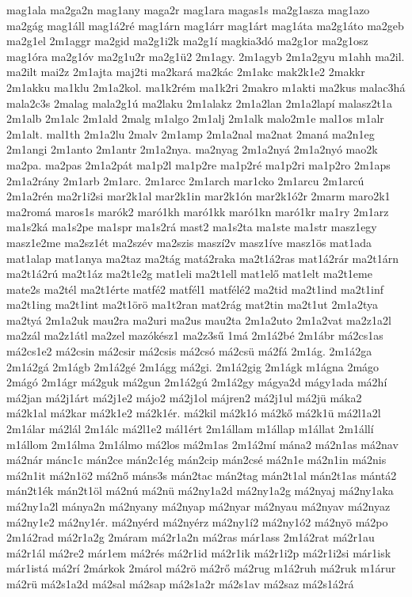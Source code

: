 {mag1ala
ma2ga2n
mag1any
maga2r
mag1ara
magas1s
ma2g1asza
mag1azo
ma2gág
mag1áll
mag1á2ré
mag1árn
mag1árr
mag1árt
mag1áta
ma2g1áto
ma2geb
ma2g1el
2m1aggr
ma2gid
ma2g1i2k
ma2g1í
magkia3dó
ma2g1or
ma2g1osz
mag1óra
ma2g1óv
ma2g1u2r
ma2g1ü2
2m1agy.
2m1agyb
2m1a2gyu
m1ahh
ma2il.
ma2ilt
mai2z
2m1ajta
maj2ti
ma2kará
ma2kác
2m1akc
mak2k1e2
2makkr
2m1akku
ma1klu
2m1a2kol.
ma1k2rém
ma1k2ri
2makro
m1akti
ma2kus
malac3há
mala2c3s
2malag
mala2g1ú
ma2laku
2m1alakz
2m1a2lan
2m1a2lapí
malasz2t1a
2m1alb
2m1alc
2m1ald
2malg
m1algo
2m1alj
2m1alk
malo2m1e
mal1os
m1alr
2m1alt.
mal1th
2m1a2lu
2malv
2m1amp
2m1a2nal
ma2nat
2maná
ma2n1eg
2m1angi
2m1anto
2m1antr
2m1a2nya.
ma2nyag
2m1a2nyá
2m1a2nyó
mao2k
ma2pa.
ma2pas
2m1a2pát
ma1p2l
ma1p2re
ma1p2ré
ma1p2ri
ma1p2ro
2m1aps
2m1a2rány
2m1arb
2m1arc.
2m1arcc
2m1arch
mar1cko
2m1arcu
2m1arcú
2m1a2rén
ma2r1i2si
mar2k1al
mar2k1in
mar2k1ón
mar2k1ó2r
2marm
maro2k1
ma2romá
maros1s
marók2
maró1kh
maró1kk
maró1kn
maró1kr
ma1ry
2m1arz
ma1s2ká
ma1s2pe
ma1spr
ma1s2rá
mast2
ma1s2ta
ma1ste
ma1str
masz1egy
masz1e2me
ma2sz1ét
ma2szév
ma2szis
maszí2v
masz1íve
masz1ös
mat1ada
mat1alap
mat1anya
ma2taz
ma2tág
matá2raka
ma2t1á2ras
mat1á2rár
ma2t1árn
ma2t1á2rú
ma2t1áz
ma2t1e2g
mat1eli
ma2t1ell
mat1elő
mat1elt
ma2t1eme
mate2s
ma2tél
ma2t1érte
matfé2
matfél1
matfélé2
ma2tid
ma2t1ind
ma2t1inf
ma2t1ing
ma2t1int
ma2t1örö
ma1t2ran
mat2rág
mat2tin
ma2t1ut
2m1a2tya
ma2tyá
2m1a2uk
mau2ra
ma2uri
ma2us
mau2ta
2m1a2uto
2m1a2vat
ma2z1a2l
ma2zál
ma2z1átl
ma2zel
mazókész1
ma2z3sű
1má
2m1á2bé
2m1ábr
má2cs1as
má2cs1e2
má2csin
má2csir
má2csis
má2csó
má2csü
má2fá
2m1ág.
2m1á2ga
2m1á2gá
2m1ágb
2m1á2gé
2m1ágg
má2gi.
2m1á2gig
2m1ágk
m1ágna
2mágo
2mágó
2m1ágr
má2guk
má2gun
2m1á2gú
2m1á2gy
mágya2d
mágy1ada
má2hí
má2jan
má2j1árt
má2j1e2
májo2
má2j1ol
májren2
má2j1ul
má2jü
máka2
má2k1al
má2kar
má2k1e2
má2k1ér.
má2kil
má2k1ó
má2kő
má2k1ü
má2l1a2l
2m1álar
má2lál
2m1álc
má2l1e2
mál1ért
2m1állam
m1állap
m1állat
2m1állí
m1állom
2m1álma
2m1álmo
má2los
má2m1as
2m1á2mí
mána2
má2n1as
má2nav
má2nár
mánc1c
mán2ce
mán2c1ég
mán2cip
mán2csé
má2n1e
má2n1in
má2nis
má2n1it
má2n1ö2
má2nő
máns3s
mán2tac
mán2tag
mán2t1al
mán2t1as
mántá2
mán2t1ék
mán2t1öl
má2nú
má2nü
má2ny1a2d
má2ny1a2g
má2nyaj
má2ny1aka
má2ny1a2l
mánya2n
má2nyany
má2nyap
má2nyar
má2nyau
má2nyav
má2nyaz
má2ny1e2
má2ny1ér.
má2nyérd
má2nyérz
má2ny1í2
má2ny1ó2
má2nyö
má2po
2m1á2rad
má2r1a2g
2máram
má2r1a2n
má2ras
már1ass
2m1á2rat
má2r1au
má2r1ál
má2re2
már1em
má2rés
má2r1id
má2r1ik
má2r1i2p
má2r1i2si
már1isk
már1istá
má2rí
2márkok
2márol
má2rö
má2rő
má2rug
m1á2ruh
má2ruk
m1árur
má2rü
má2s1a2d
má2sal
má2sap
má2s1a2r
má2s1av
má2saz
má2s1á2rá
}

